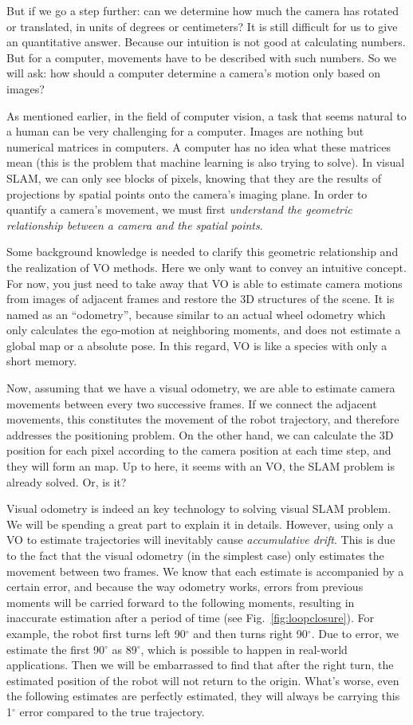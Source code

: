 But if we go a step further: can we determine how much the camera has rotated or translated, in units of degrees or centimeters? It is still difficult for us to give an quantitative answer. Because our intuition is not good at calculating numbers. But for a computer, movements have to be described with such numbers. So we will ask: how should a computer determine a camera's motion only based on images?

As mentioned earlier, in the field of computer vision, a task that seems natural to a human can be very challenging for a computer. Images are nothing but numerical matrices in computers. A computer has no idea what these matrices mean (this is the problem that machine learning is also trying to solve). In visual SLAM, we can only see blocks of pixels, knowing that they are the results of projections by spatial points onto the camera's imaging plane. In order to quantify a camera's movement, we must first \emph{understand the geometric relationship between a camera and the spatial points}.

Some background knowledge is needed to clarify this geometric relationship and the realization of VO methods. Here we only want to convey an intuitive concept. For now, you just need to take away that VO is able to estimate camera motions from images of adjacent frames and restore the 3D structures of the scene. It is named as an ``odometry'', because similar to an actual wheel odometry which only calculates the ego-motion at neighboring moments, and does not estimate a global map or a absolute pose. In this regard, VO is like a species with only a short memory.

Now, assuming that we have a visual odometry, we are able to estimate camera movements between every two successive frames. If we connect the adjacent movements, this constitutes the movement of the robot trajectory, and therefore addresses the positioning problem. On the other hand, we can calculate the 3D position for each pixel according to the camera position at each time step, and they will form an map. Up to here, it seems with an VO, the SLAM problem is already solved. Or, is it?

Visual odometry is indeed an key technology to solving visual SLAM problem. We will be spending a great part to explain it in details. However, using only a VO to estimate trajectories will inevitably cause \emph{accumulative drift}. This is due to the fact that the visual odometry (in the simplest case) only estimates the movement between two frames. We know that each estimate is accompanied by a certain error, and because the way odometry works, errors from previous moments will be carried forward to the following moments, resulting in inaccurate estimation after a period of time (see Fig.~\ref{fig:loopclosure}). For example, the robot first turns left 90$^\circ$ and then turns right 90$^\circ$. Due to error, we estimate the first 90$^\circ$ as 89$^\circ$, which is possible to happen in real-world applications. Then we will be embarrassed to find that after the right turn, the estimated position of the robot will not return to the origin. What's worse, even the following estimates are perfectly estimated, they will always be carrying this 1$^\circ$ error compared to the true trajectory.

